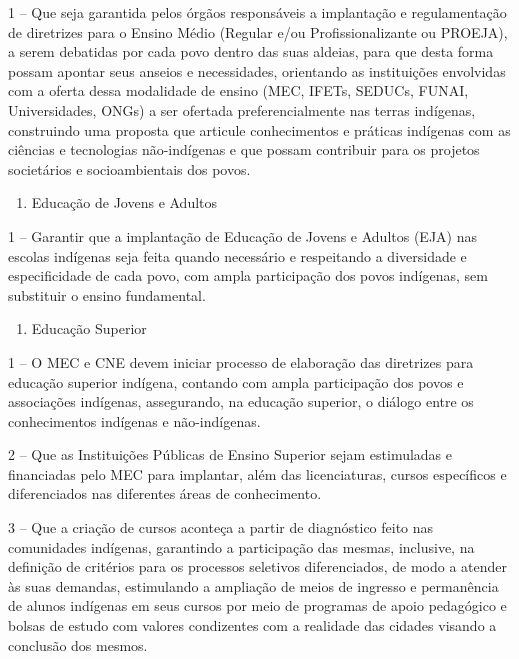 \documentclass[
]{book}
\providecommand{\tightlist}{%
  \setlength{\itemsep}{0pt}\setlength{\parskip}{0pt}}
\begin{document}
1 -- Que seja garantida pelos órgãos responsáveis a implantação e regulamentação de diretrizes para o Ensino Médio (Regular e/ou Profissionalizante ou PROEJA), a serem debatidas por cada povo dentro das suas aldeias, para que desta forma possam apontar seus anseios e necessidades, orientando as instituições envolvidas com a oferta dessa modalidade de ensino (MEC, IFETs, SEDUCs, FUNAI, Universidades, ONGs) a ser ofertada preferencialmente nas terras indígenas, construindo uma proposta que articule conhecimentos e práticas indígenas com as ciências e tecnologias não-indígenas e que possam contribuir para os projetos societários e socioambientais dos povos.

\begin{enumerate}
\def\labelenumi{\Alph{enumi})}
\setcounter{enumi}{3}
\tightlist
\item
  Educação de Jovens e Adultos
\end{enumerate}

1 -- Garantir que a implantação de Educação de Jovens e Adultos (EJA) nas escolas indígenas seja feita quando necessário e respeitando a diversidade e especificidade de cada povo, com ampla participação dos povos indígenas, sem substituir o ensino fundamental.

\begin{enumerate}
\def\labelenumi{\Alph{enumi})}
\setcounter{enumi}{4}
\tightlist
\item
  Educação Superior
\end{enumerate}

1 -- O MEC e CNE devem iniciar processo de elaboração das diretrizes para educação superior indígena, contando com ampla participação dos povos e associações indígenas, assegurando, na educação superior, o diálogo entre os conhecimentos indígenas e não-indígenas.

2 -- Que as Instituições Públicas de Ensino Superior sejam estimuladas e financiadas pelo MEC para implantar, além das licenciaturas, cursos específicos e diferenciados nas diferentes áreas de conhecimento.

3 -- Que a criação de cursos aconteça a partir de diagnóstico feito nas comunidades indígenas, garantindo a participação das mesmas, inclusive, na definição de critérios para os processos seletivos diferenciados, de modo a atender às suas demandas, estimulando a ampliação de meios de ingresso e permanência de alunos indígenas em seus cursos por meio de programas de apoio pedagógico e bolsas de estudo com valores condizentes com a realidade das cidades visando a conclusão dos mesmos.
\end{document}
